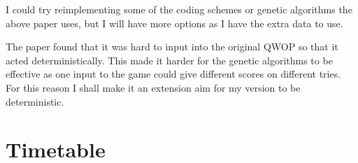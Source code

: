 \documentclass[12pt,a4paper,twoside]{article}
\begin{document}
I could try reimplementing some of the coding schemes or genetic algorithms the above paper uses, but I will have more options as I have the extra data to use.

The paper found that it was hard to input into the original QWOP so that it acted deterministically.
This made it harder for the genetic algorithms to be effective as one input to the game could give different scores on different tries.
For this reason I shall make it an extension aim for my version to be deterministic.



\section*{Timetable}


\end{document}
